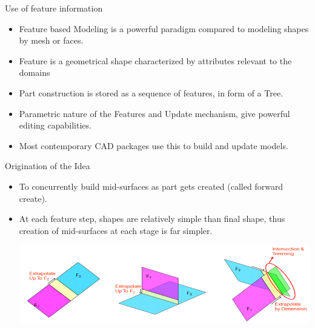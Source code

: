 
\begin{frame}{Use of feature information}
\begin{itemize}[noitemsep,label=\textbullet,topsep=2pt,parsep=2pt,partopsep=2pt]
\item Feature based Modeling is a powerful paradigm compared to modeling shapes by mesh or faces.
\item Feature is a geometrical shape characterized by attributes relevant to the domains
\item Part construction is stored as a sequence of features, in form of a Tree.
\item Parametric nature of the Features and Update mechanism, give powerful editing capabilities.
\item Most contemporary CAD packages use this to build and update models.
\end{itemize}
\end{frame}


\begin{frame}[<+-| alert@+>]{Origination of the Idea}

\begin{itemize}[noitemsep,label=\textbullet,topsep=2pt,parsep=2pt,partopsep=2pt]
\item To concurrently build mid-surfaces as part gets created (called forward create). 
\item At each feature step, shapes are relatively simple than final shape, thus creation of mid-surfaces at each stage is far simpler.

\vspace{0.5cm}

\includegraphics[width=0.95\linewidth]{../Common/images/ExtendTrim.png}

\end{itemize}
\end{frame}


